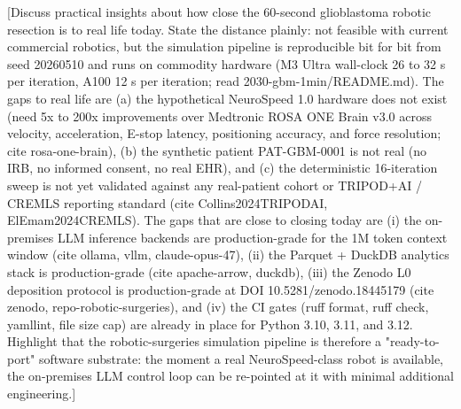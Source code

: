 [Discuss practical insights about how close the 60-second
glioblastoma robotic resection is to real life today. State the
distance plainly: not feasible with current commercial robotics, but
the simulation pipeline is reproducible bit for bit from seed
20260510 and runs on commodity hardware (M3 Ultra wall-clock 26 to
32 s per iteration, A100 12 s per iteration; read
2030-gbm-1min/README.md). The gaps to real life are (a) the
hypothetical NeuroSpeed 1.0 hardware does not exist (need 5x to 200x
improvements over Medtronic ROSA ONE Brain v3.0 across velocity,
acceleration, E-stop latency, positioning accuracy, and force
resolution; cite rosa-one-brain), (b) the synthetic patient PAT-GBM-0001
is not real (no IRB, no informed consent, no real EHR), and (c) the
deterministic 16-iteration sweep is not yet validated against any
real-patient cohort or TRIPOD+AI / CREMLS reporting standard (cite
Collins2024TRIPODAI, ElEmam2024CREMLS). The gaps that are close to
closing today are (i) the on-premises LLM inference backends are
production-grade for the 1M token context window (cite ollama, vllm,
claude-opus-47), (ii) the Parquet + DuckDB analytics stack is
production-grade (cite apache-arrow, duckdb), (iii) the Zenodo L0
deposition protocol is production-grade at DOI 10.5281/zenodo.18445179
(cite zenodo, repo-robotic-surgeries), and (iv) the CI gates (ruff
format, ruff check, yamllint, file size cap) are already in place
for Python 3.10, 3.11, and 3.12. Highlight that the
robotic-surgeries simulation pipeline is therefore a "ready-to-port"
software substrate: the moment a real NeuroSpeed-class robot is
available, the on-premises LLM control loop can be re-pointed at it
with minimal additional engineering.]
